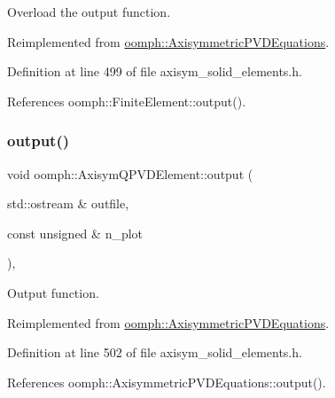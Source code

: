 Overload the output function. 



Reimplemented from \hyperlink{classoomph_1_1AxisymmetricPVDEquations_a70c01efa665238ec7a574588209d3edb}{oomph\+::\+Axisymmetric\+P\+V\+D\+Equations}.



Definition at line 499 of file axisym\+\_\+solid\+\_\+elements.\+h.



References oomph\+::\+Finite\+Element\+::output().

\mbox{\label{classoomph_1_1AxisymQPVDElement_ab9925995ad1b184df43b6eb350f3e0bd}} 
\subsubsection{\texorpdfstring{output()}{output()}\hspace{0.1cm}{\footnotesize\ttfamily [2/4]}}
{\footnotesize\ttfamily void oomph\+::\+Axisym\+Q\+P\+V\+D\+Element\+::output (\begin{DoxyParamCaption}\item[{std\+::ostream \&}]{outfile,  }\item[{const unsigned \&}]{n\+\_\+plot }\end{DoxyParamCaption})\hspace{0.3cm}{\ttfamily [inline]}, {\ttfamily [virtual]}}



Output function. 



Reimplemented from \hyperlink{classoomph_1_1AxisymmetricPVDEquations_a35cf174ca1692f817e3182166e22ef4b}{oomph\+::\+Axisymmetric\+P\+V\+D\+Equations}.



Definition at line 502 of file axisym\+\_\+solid\+\_\+elements.\+h.



References oomph\+::\+Axisymmetric\+P\+V\+D\+Equations\+::output().

\mbox{\label{classoomph_1_1AxisymQPVDElement_abc2012c37faa9153f18fab2ff273bc9a}} 
